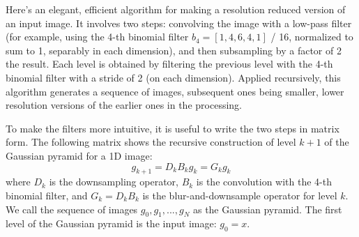 Here's an elegant, efficient algorithm for making a resolution reduced version of an input image.  It involves two steps:  convolving the
image with a low-pass filter (for example, using the 4-th binomial filter $b_4 = [1, 4, 6, 4, 1]$ / 16, normalized to sum to 1, separably in each dimension), and then subsampling by a factor of 2 the result. Each level is obtained by filtering the previous level with the 4-th binomial filter with a stride of 2 (on each dimension). Applied recursively, this algorithm generates a sequence of images,  subsequent ones being smaller, lower resolution versions of the earlier ones in the processing.

To make the filters more intuitive, it is useful to write the two steps in matrix form. The following matrix shows the recursive construction of  level $k+1$ of the Gaussian pyramid for a 1D image:
\begin{equation}
	g_{k+1} = D_k B_k g_k = G_k g_k
\end{equation}
where $D_k$ is the downsampling operator, $B_k$ is the convolution with the 4-th binomial filter, and $G_k = D_kB_k$ is the blur-and-downsample operator for level $k$. We call the  sequence of images  $g_0,  g_1, . . ., g_N$  as the Gaussian pyramid.  The first level of the Gaussian pyramid is the input image: $g_0=x$.


